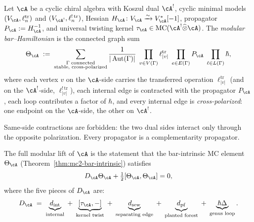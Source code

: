 \begin{definition}
\label{def:modular-bar-hamiltonian}
Let $\cA$ be a cyclic chiral algebra with Koszul dual $\cA^!$,
cyclic minimal models $(V_{\cA}, \ell_n^{\mathrm{tr}})$ and
$(V_{\cA^!}, \ell_n^{!\,\mathrm{tr}})$, Hessian
$H_{\cA}\colon V_{\cA} \xrightarrow{\sim} V_{\cA}^*[-1]$,
propagator $P_{\cA} := H_{\cA}^{-1}$, and universal twisting
kernel $\tau_{\cA} \in \operatorname{MC}(\cA^!\widehat\otimes\cA)$.
The \emph{modular bar--Hamiltonian} is the connected graph sum
\begin{equation}
\label{eq:modular-bar-hamiltonian}
\Theta_{\cA}
\;:=\;
\sum_{\substack{
\Gamma\;\text{connected}\\
\text{stable, cross-polarized}}}
\frac{1}{|\operatorname{Aut}(\Gamma)|}
\;\prod_{v \in V(\Gamma)}
\ell_{|v|}^{\mathrm{tr}}
\;\prod_{e \in E(\Gamma)} P_{\cA}
\;\prod_{\ell \in L(\Gamma)} \hbar,
\end{equation}
where each vertex $v$ on the $\cA$-side carries the transferred
operation $\ell_{|v|}^{\mathrm{tr}}$ (and on the $\cA^!$-side,
$\ell_{|v|}^{!\,\mathrm{tr}}$), each internal edge is contracted
with the propagator $P_{\cA}$, each loop contributes a factor
of $\hbar$, and every internal edge is \emph{cross-polarized}:
one endpoint on the $\cA$-side, the other on $\cA^!$.
\end{definition}

\begin{remark}
\label{rem:cross-polarization}
Same-side contractions are forbidden: the two dual sides
interact only through the opposite polarization.
Every propagator is a complementarity propagator.
\end{remark}

\begin{definition}
\label{def:ambient-master-equation}
The full modular lift of $\cA$ is the statement
that the bar-intrinsic MC element $\Theta_{\cA}$
(Theorem~\ref{thm:mc2-bar-intrinsic}) satisfies
\begin{equation}
\label{eq:ambient-master-equation}
D_{\cA}\Theta_{\cA}
+ \tfrac12[\Theta_{\cA},\Theta_{\cA}] = 0,
\end{equation}
where the five pieces of $D_{\cA}$ are:
\begin{equation}
\label{eq:ambient-differential}
D_{\cA}
\;=\;
\underbrace{d_{\mathrm{int}}}_{\text{internal}}
\;+\;
\underbrace{[\tau_{\cA},-]}_{\text{kernel twist}}
\;+\;
\underbrace{d_{\mathrm{sew}}}_{\text{separating edge}}
\;+\;
\underbrace{d_{\mathrm{pf}}}_{\text{planted forest}}
\;+\;
\underbrace{\hbar\Delta}_{\text{genus loop}}.
\end{equation}
\end{definition}

